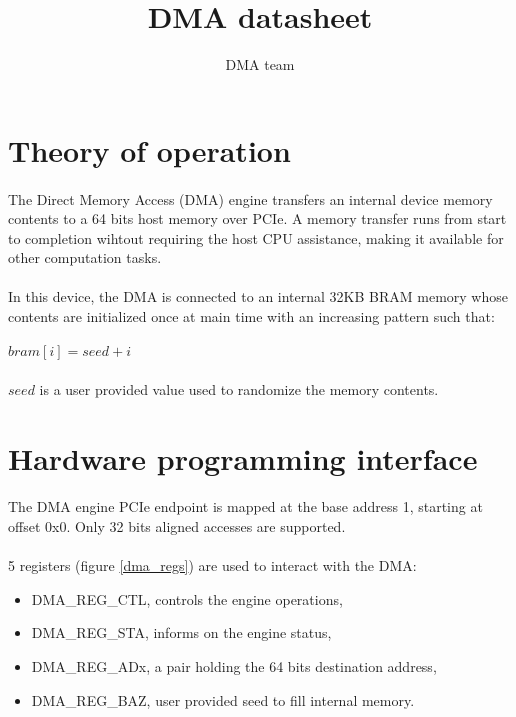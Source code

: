 \documentclass[a4paper, 11pt]{article}
\begin{document}
\title{DMA datasheet}
\author{DMA team}
\date{}

\maketitle

\newpage
\tableofcontents
{}


\newpage
\section{Theory of operation}
\paragraph{}
The Direct Memory Access (DMA) engine transfers an internal device memory
contents to a 64 bits host memory over PCIe. A memory transfer runs from
start to completion wihtout requiring the host CPU assistance, making it
available for other computation tasks.
\paragraph{}
In this device, the DMA is connected to an internal 32KB BRAM memory whose
contents are initialized once at main time with an increasing pattern such
that:
\begin{center}$bram[i] = seed + i$\end{center}
\paragraph{}
$seed$ is a user provided value used to randomize the memory contents.


\newpage
\section{Hardware programming interface}
\paragraph{}
The DMA engine PCIe endpoint is mapped at the base address 1, starting at
offset 0x0. Only 32 bits aligned accesses are supported.
\paragraph{}
5 registers (figure \ref{dma_regs}) are used to interact with the DMA:
\begin{itemize}
\item DMA\_REG\_CTL, controls the engine operations,
\item DMA\_REG\_STA, informs on the engine status,
\item DMA\_REG\_ADx, a pair holding the 64 bits destination address,
\item DMA\_REG\_BAZ, user provided seed to fill internal memory.
\end{itemize}
\end{document}
